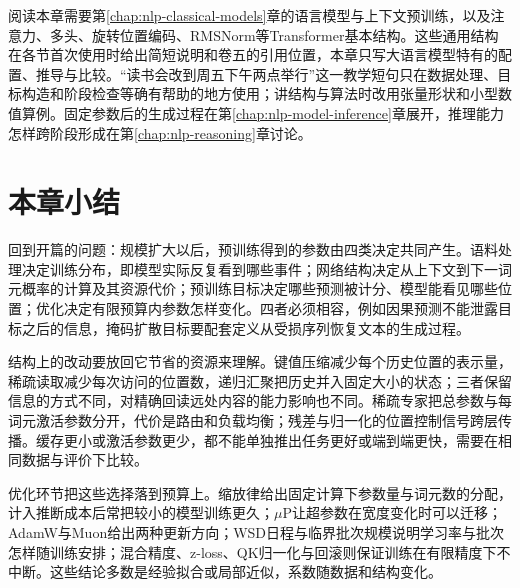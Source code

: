 阅读本章需要第\ref{chap:nlp-classical-models}章的语言模型与上下文预训练，以及注意力、多头、旋转位置编码、RMSNorm等Transformer基本结构。这些通用结构在各节首次使用时给出简短说明和卷五的引用位置，本章只写大语言模型特有的配置、推导与比较。“读书会改到周五下午两点举行”这一教学短句只在数据处理、目标构造和阶段检查等确有帮助的地方使用；讲结构与算法时改用张量形状和小型数值算例。固定参数后的生成过程在第\ref{chap:nlp-model-inference}章展开，推理能力怎样跨阶段形成在第\ref{chap:nlp-reasoning}章讨论。










\section{本章小结}
\label{sec:nlp-llm-summary}

回到开篇的问题：规模扩大以后，预训练得到的参数由四类决定共同产生。语料处理决定训练分布，即模型实际反复看到哪些事件；网络结构决定从上下文到下一词元概率的计算及其资源代价；预训练目标决定哪些预测被计分、模型能看见哪些位置；优化决定有限预算内参数怎样变化。四者必须相容，例如因果预测不能泄露目标之后的信息，掩码扩散目标要配套定义从受损序列恢复文本的生成过程。

结构上的改动要放回它节省的资源来理解。键值压缩减少每个历史位置的表示量，稀疏读取减少每次访问的位置数，递归汇聚把历史并入固定大小的状态；三者保留信息的方式不同，对精确回读远处内容的能力影响也不同。稀疏专家把总参数与每词元激活参数分开，代价是路由和负载均衡；残差与归一化的位置控制信号跨层传播。缓存更小或激活参数更少，都不能单独推出任务更好或端到端更快，需要在相同数据与评价下比较。

优化环节把这些选择落到预算上。缩放律给出固定计算下参数量与词元数的分配，计入推断成本后常把较小的模型训练更久；$\mu$P让超参数在宽度变化时可以迁移；AdamW与Muon给出两种更新方向；WSD日程与临界批次规模说明学习率与批次怎样随训练安排；混合精度、z-loss、QK归一化与回滚则保证训练在有限精度下不中断。这些结论多数是经验拟合或局部近似，系数随数据和结构变化。

